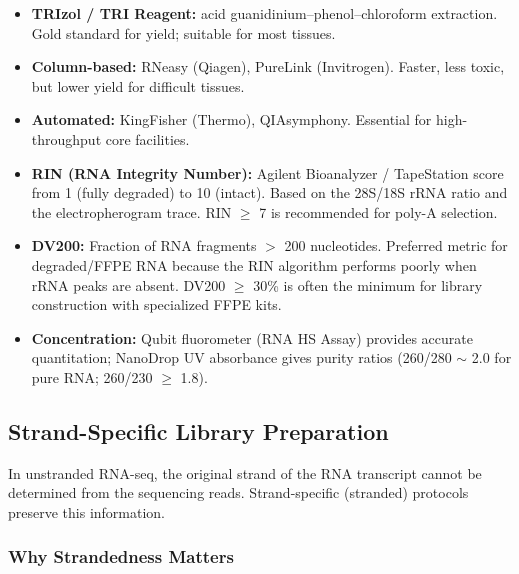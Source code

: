\begin{description}[style=nextline]
  \item[Extraction methods]
    \begin{itemize}[nosep]
      \item \textbf{TRIzol / TRI Reagent:} acid guanidinium--phenol--chloroform
        extraction. Gold standard for yield; suitable for most tissues.
      \item \textbf{Column-based:} RNeasy (Qiagen), PureLink (Invitrogen). Faster,
        less toxic, but lower yield for difficult tissues.
      \item \textbf{Automated:} KingFisher (Thermo), QIAsymphony. Essential for
        high-throughput core facilities.
    \end{itemize}
  \item[Quality metrics]
    \begin{itemize}[nosep]
      \item \textbf{RIN (RNA Integrity Number):} Agilent Bioanalyzer / TapeStation
        score from 1 (fully degraded) to 10 (intact). Based on the 28S/18S rRNA
        ratio and the electropherogram trace. RIN $\geq$ 7 is recommended for
        poly-A selection.
      \item \textbf{DV200:} Fraction of RNA fragments $>$ 200 nucleotides.
        Preferred metric for degraded/FFPE RNA because the RIN algorithm
        performs poorly when rRNA peaks are absent. DV200 $\geq$ 30\% is
        often the minimum for library construction with specialized FFPE kits.
      \item \textbf{Concentration:} Qubit fluorometer (RNA HS Assay) provides
        accurate quantitation; NanoDrop UV absorbance gives purity ratios
        (260/280 $\sim$ 2.0 for pure RNA; 260/230 $\geq$ 1.8).
    \end{itemize}
\end{description}

\subsection{Strand-Specific Library Preparation}
\label{sec:rnaseq:stranded}

In unstranded \acrshort{RNA-seq}, the original strand of the RNA transcript
cannot be determined from the sequencing reads. Strand-specific (stranded)
protocols preserve this information.

\subsubsection{Why Strandedness Matters}

